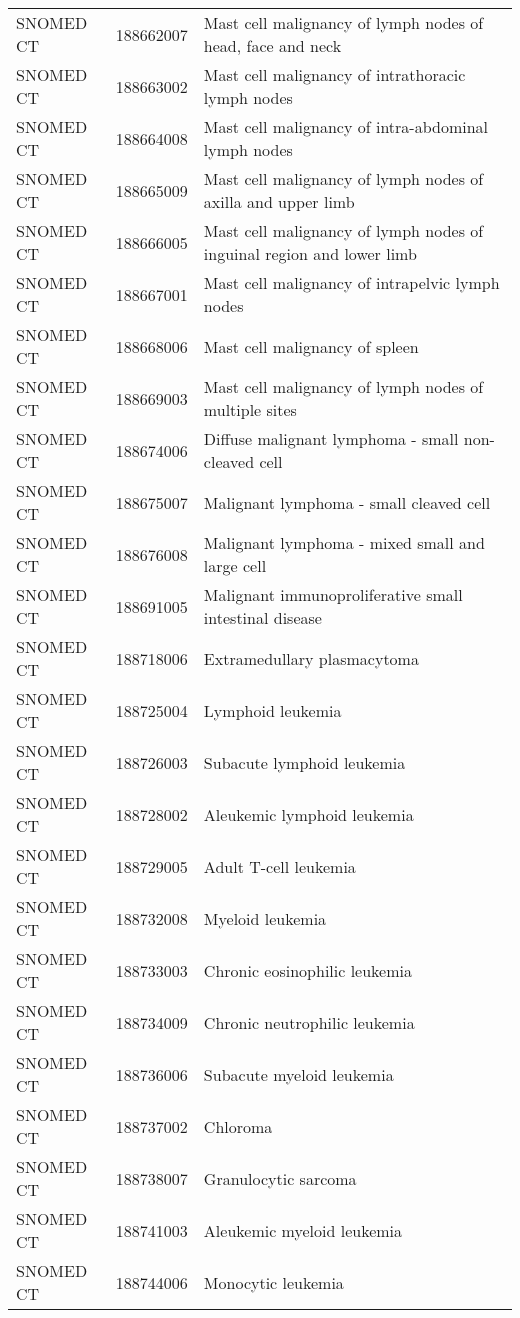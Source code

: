 \begin{table}[ht]
\begin{tabular}{lll}
  SNOMED CT & 188662007 & Mast cell malignancy of lymph nodes of head, face and neck \\ 
  SNOMED CT & 188663002 & Mast cell malignancy of intrathoracic lymph nodes \\ 
  SNOMED CT & 188664008 & Mast cell malignancy of intra-abdominal lymph nodes \\ 
  SNOMED CT & 188665009 & Mast cell malignancy of lymph nodes of axilla and upper limb \\ 
  SNOMED CT & 188666005 & Mast cell malignancy of lymph nodes of inguinal region and lower limb \\ 
  SNOMED CT & 188667001 & Mast cell malignancy of intrapelvic lymph nodes \\ 
  SNOMED CT & 188668006 & Mast cell malignancy of spleen \\ 
  SNOMED CT & 188669003 & Mast cell malignancy of lymph nodes of multiple sites \\ 
  SNOMED CT & 188674006 & Diffuse malignant lymphoma - small non-cleaved cell \\ 
  SNOMED CT & 188675007 & Malignant lymphoma - small cleaved cell \\ 
  SNOMED CT & 188676008 & Malignant lymphoma - mixed small and large cell \\ 
  SNOMED CT & 188691005 & Malignant immunoproliferative small intestinal disease \\ 
  SNOMED CT & 188718006 & Extramedullary plasmacytoma \\ 
  SNOMED CT & 188725004 & Lymphoid leukemia \\ 
  SNOMED CT & 188726003 & Subacute lymphoid leukemia \\ 
  SNOMED CT & 188728002 & Aleukemic lymphoid leukemia \\ 
  SNOMED CT & 188729005 & Adult T-cell leukemia \\ 
  SNOMED CT & 188732008 & Myeloid leukemia \\ 
  SNOMED CT & 188733003 & Chronic eosinophilic leukemia \\ 
  SNOMED CT & 188734009 & Chronic neutrophilic leukemia \\ 
  SNOMED CT & 188736006 & Subacute myeloid leukemia \\ 
  SNOMED CT & 188737002 & Chloroma \\ 
  SNOMED CT & 188738007 & Granulocytic sarcoma \\ 
  SNOMED CT & 188741003 & Aleukemic myeloid leukemia \\ 
  SNOMED CT & 188744006 & Monocytic leukemia \\ 

\end{tabular}
\end{table}
